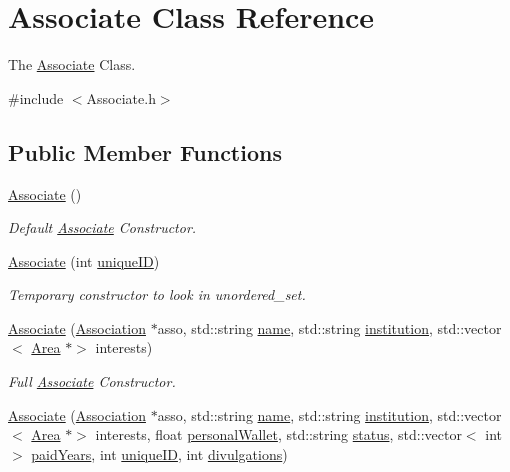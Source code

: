 \hypertarget{classAssociate}{}\section{Associate Class Reference}
\label{classAssociate}


The \mbox{\hyperlink{classAssociate}{Associate}} Class.  




{\ttfamily \#include $<$Associate.\+h$>$}

\subsection*{Public Member Functions}
\begin{DoxyCompactItemize}
\item 
\mbox{\hyperlink{classAssociate_a624e687ad91b6311e7e493adab0a9adc}{Associate}} ()
\begin{DoxyCompactList}\small\item\em Default \mbox{\hyperlink{classAssociate}{Associate}} Constructor. \end{DoxyCompactList}\item 
\mbox{\hyperlink{classAssociate_abe5c3e0d0f938dd44924e9d488aad870}{Associate}} (int \mbox{\hyperlink{classAssociate_a55a1f311ac7cb8020e9631f283cb74e6}{unique\+ID}})
\begin{DoxyCompactList}\small\item\em Temporary constructor to look in unordered\+\_\+set. \end{DoxyCompactList}\item 
\mbox{\hyperlink{classAssociate_ad27f76fd03a10e75d1b2660e60ba009f}{Associate}} (\mbox{\hyperlink{classAssociation}{Association}} $\ast$asso, std\+::string \mbox{\hyperlink{classAssociate_ad52875abacf1836cd879b7dffb88d589}{name}}, std\+::string \mbox{\hyperlink{classAssociate_a25b82eab07e159a91ebdc64fa4d656ab}{institution}}, std\+::vector$<$ \mbox{\hyperlink{classArea}{Area}} $\ast$$>$ interests)
\begin{DoxyCompactList}\small\item\em Full \mbox{\hyperlink{classAssociate}{Associate}} Constructor. \end{DoxyCompactList}\item 
\mbox{\hyperlink{classAssociate_acf0e7ad78370aef9d72896cd3385fd7c}{Associate}} (\mbox{\hyperlink{classAssociation}{Association}} $\ast$asso, std\+::string \mbox{\hyperlink{classAssociate_ad52875abacf1836cd879b7dffb88d589}{name}}, std\+::string \mbox{\hyperlink{classAssociate_a25b82eab07e159a91ebdc64fa4d656ab}{institution}}, std\+::vector$<$ \mbox{\hyperlink{classArea}{Area}} $\ast$$>$ interests, float \mbox{\hyperlink{classAssociate_adc7e2decb409cd226e1508c1c5df3b90}{personal\+Wallet}}, std\+::string \mbox{\hyperlink{classAssociate_aacf79a4e389c7db3d8636b788cb2089f}{status}}, std\+::vector$<$ int $>$ \mbox{\hyperlink{classAssociate_ad7d373d77a5c49eb845e89729962c30d}{paid\+Years}}, int \mbox{\hyperlink{classAssociate_a55a1f311ac7cb8020e9631f283cb74e6}{unique\+ID}}, int \mbox{\hyperlink{classAssociate_a5f697e757ce7e1be1ed4a2421679b804}{divulgations}})

\end{DoxyCompactItemize}
